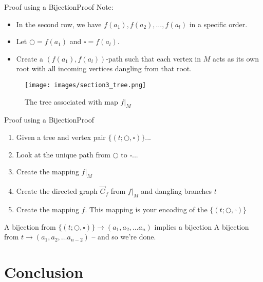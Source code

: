 \documentclass[10pt]{beamer}
\theoremstyle{definition}
\newcommand{\Sthree}{Proof using a Bijection}
\newcommand{\SthreeSSproof}{Proof}
\newcommand{\Sfour}{Conclusion}
\begin{document}
\begin{frame}{\Sthree}{\SthreeSSproof}
Note:
\begin{itemize}
  \item In the second row, we have $f(a_{1}), f(a_{2}), \ldots, f(a_{l})$ in a specific order.
  \pause
  \item Let $\bigcirc=f(a_{1})$ and $\square=f(a_{l})$. 
  \pause
  \item Create a $(f(a_{1}),f(a_{l}))$-path such that each vertex in $M$ acts as its own root with all incoming vertices dangling from that root.
\end{itemize}

\pause 

\begin{figure}
  \texttt{[image: images/section3\_tree.png]}
  \caption{The tree associated with map $f|_{M}$}
  \label{fig:section3_tree}
\end{figure}

\end{frame}

\begin{frame}{\Sthree}{\SthreeSSproof}
\begin{enumerate}
  \item Given a tree and vertex pair $\{(t; \bigcirc, \square)\}$...
  \pause
  \item Look at the unique path from $\bigcirc$ to $\square$...
  \pause
  \item Create the mapping $f|_{M}$
  \pause
  \item Create the directed graph $\vec G_{f}$ from $f|_{M}$ and dangling branches $t$
  \pause
  \item Create the mapping $f$. This mapping is your encoding of the $\{(t; \bigcirc, \square)\}$
\end{enumerate}
  
\pause
  
A bijection from $\{(t; \bigcirc, \square)\} \rightarrow (a_{1},a_{2},\ldots a_{n})$ implies a bijection A bijection from $t \rightarrow (a_{1},a_{2},\ldots a_{n-2})$ -- and so we're done.
  
\end{frame}

\section{\Sfour}
\end{document}

